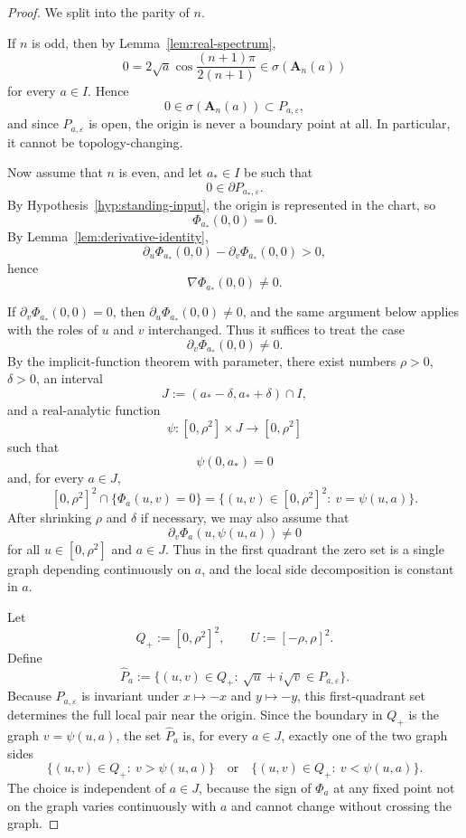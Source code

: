 \documentclass[11pt]{article}
\begin{document}
\begin{proof}
We split into the parity of \(n\).

If \(n\) is odd, then by Lemma~\ref{lem:real-spectrum},
\[
0=2\sqrt a\cos\frac{(n+1)\pi}{2(n+1)}\in \sigma(\mathbf A_n(a))
\]
for every \(a\in I\). Hence
\[
0\in \sigma(\mathbf A_n(a))\subset P_{a,\varepsilon},
\]
and since \(P_{a,\varepsilon}\) is open, the origin is never a boundary point at all. In particular, it cannot be topology-changing.

Now assume that \(n\) is even, and let \(a_*\in I\) be such that
\[
0\in \partial P_{a_*,\varepsilon}.
\]
By Hypothesis~\ref{hyp:standing-input}, the origin is represented in the chart, so
\[
\Phi_{a_*}(0,0)=0.
\]
By Lemma~\ref{lem:derivative-identity},
\[
\partial_u\Phi_{a_*}(0,0)-\partial_v\Phi_{a_*}(0,0)>0,
\]
hence
\[
\nabla \Phi_{a_*}(0,0)\neq 0.
\]

If \(\partial_v\Phi_{a_*}(0,0)=0\), then \(\partial_u\Phi_{a_*}(0,0)\neq 0\), and the same argument below applies with the roles of \(u\) and \(v\) interchanged. Thus it suffices to treat the case
\[
\partial_v\Phi_{a_*}(0,0)\neq 0.
\]
By the implicit-function theorem with parameter, there exist numbers \(\rho>0\), \(\delta>0\), an interval
\[
J:=(a_*-\delta,a_*+\delta)\cap I,
\]
and a real-analytic function
\[
\psi:[0,\rho^2]\times J\to[0,\rho^2]
\]
such that
\[
\psi(0,a_*)=0
\]
and, for every \(a\in J\),
\[
[0,\rho^2]^2\cap \{\Phi_a(u,v)=0\}
=
\{(u,v)\in [0,\rho^2]^2:\ v=\psi(u,a)\}.
\]
After shrinking \(\rho\) and \(\delta\) if necessary, we may also assume that
\[
\partial_v\Phi_a(u,\psi(u,a))\neq 0
\]
for all \(u\in[0,\rho^2]\) and \(a\in J\). Thus in the first quadrant the zero set is a single graph depending continuously on \(a\), and the local side decomposition is constant in \(a\).

Let
\[
Q_+:=[0,\rho^2]^2,
\qquad
U:=[-\rho,\rho]^2.
\]
Define
\[
\widehat P_a
:=
\{(u,v)\in Q_+:\ \sqrt u+i\sqrt v\in P_{a,\varepsilon}\}.
\]
Because \(P_{a,\varepsilon}\) is invariant under \(x\mapsto -x\) and \(y\mapsto -y\), this first-quadrant set determines the full local pair near the origin. Since the boundary in \(Q_+\) is the graph \(v=\psi(u,a)\), the set \(\widehat P_a\) is, for every \(a\in J\), exactly one of the two graph sides
\[
\{(u,v)\in Q_+:\ v>\psi(u,a)\}
\quad\text{or}\quad
\{(u,v)\in Q_+:\ v<\psi(u,a)\}.
\]
The choice is independent of \(a\in J\), because the sign of \(\Phi_a\) at any fixed point not on the graph varies continuously with \(a\) and cannot change without crossing the graph.


\end{proof}
\end{document}
